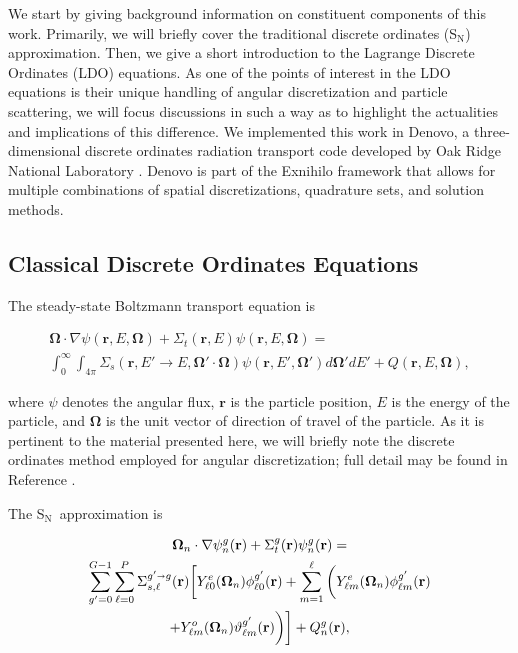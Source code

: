\documentclass{article} %
\newcommand{\sa}{\shortrightarrow}
\newcommand{\bo}{\mathbf\Omega}
\newcommand{\vecr}{\textbf{r}}
\newcommand{\sn}{S$_\mathrm{N}$}
\newcommand{\Ye}[2]{\ensuremath{Y^e_{#1}(\bo_#2)}}
\newcommand{\Yo}[2]{\ensuremath{Y^o_{#1}(\bo_#2)}}
\begin{document}
We start by giving background information on constituent components
of this work. Primarily, we will briefly cover the traditional discrete ordinates (\sn) approximation.
Then, we give a short introduction to the Lagrange Discrete Ordinates (LDO)
equations. As one of the points of interest in the LDO equations is their
unique handling of angular discretization and particle scattering, we will
focus discussions in such a way as to highlight the actualities and
implications of this difference.
We implemented this work in Denovo, a three-dimensional discrete ordinates radiation transport code
developed by Oak Ridge National Laboratory \cite{denovo}. Denovo is part of
the Exnihilo framework that allows for multiple combinations of spatial
discretizations, quadrature sets, and solution methods. 

\subsection{Classical Discrete Ordinates Equations}
The steady-state Boltzmann transport equation is

\begin{multline}
\bo \cdot \nabla \psi(\vecr,E,\bo) + \Sigma_t(\vecr,E) \psi(\vecr,E,\bo) = \\
\int_0^\infty\int_{4\pi} \Sigma_s(\vecr,E'\rightarrow E,\bo'\cdot\bo)
\psi(\vecr,E',\bo')d\bo'dE' + Q(\vecr,E,\bo),
\label{eq:bte}
\end{multline}

\noindent where $\psi$ denotes the angular flux, $\vecr$ is the particle
position, $E$ is the energy of the particle,
and $\bo$ is the unit vector of direction of travel of the particle. As it is
pertinent to the material presented here, we will briefly note the discrete
ordinates method employed for angular discretization; full detail may
be found in Reference \cite{denovo}.

The \sn\ approximation is

\begin{multline}
\bo_n \cdot \nabla \psi_n^g(\vecr) + \Sigma_t^g(\vecr)\psi_n^g(\vecr) = \\
\sum_{g'=0}^{G-1}\sum_{\ell=0}^{P}\Sigma_{s,\ell}^{g'\sa g}(\vecr)
\bigg[\Ye{\ell 0}{n}\phi_{\ell 0}^{g'}(\vecr) + \sum_{m=1}^{\ell}
\bigg(\Ye{\ell m}{n}\phi_{\ell m}^{g'}(\vecr) \\
 + \Yo{\ell m}{n}\vartheta_{\ell m}^{g'}(\vecr)\bigg)\bigg]
+ Q_n^g(\vecr),
\label{eq:sn}
\end{multline}
\end{document}
